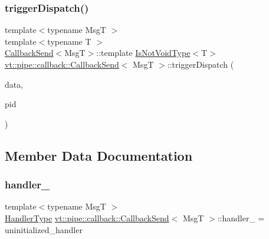 \mbox{\label{structvt_1_1pipe_1_1callback_1_1_callback_send_a5b9348d4e16bfc8718638bf2a2d06e20}} 
\subsubsection{\texorpdfstring{trigger\+Dispatch()}{triggerDispatch()}\hspace{0.1cm}{\footnotesize\ttfamily [4/4]}}
{\footnotesize\ttfamily template$<$typename MsgT $>$ \\
template$<$typename T $>$ \\
\hyperlink{structvt_1_1pipe_1_1callback_1_1_callback_send}{Callback\+Send}$<$MsgT$>$\+::template \hyperlink{structvt_1_1pipe_1_1callback_1_1_callback_send_adb85e64e67e00aa71a9c173565dfb7dc}{Is\+Not\+Void\+Type}$<$T$>$ \hyperlink{structvt_1_1pipe_1_1callback_1_1_callback_send}{vt\+::pipe\+::callback\+::\+Callback\+Send}$<$ MsgT $>$\+::trigger\+Dispatch (\begin{DoxyParamCaption}\item[{\hyperlink{structvt_1_1pipe_1_1callback_1_1_callback_send_a5b21820f25b28f980921b1fe24d8a2dc}{Signal\+Data\+Type} $\ast$}]{data,  }\item[{\mbox{[}\mbox{[}maybe\+\_\+unused\mbox{]} \mbox{]} \hyperlink{namespacevt_ac9852acda74d1896f48f406cd72c7bd3}{Pipe\+Type} const \&}]{pid }\end{DoxyParamCaption})}



\subsection{Member Data Documentation}
\mbox{\label{structvt_1_1pipe_1_1callback_1_1_callback_send_adc779eec6db67dce8bedd1b4bb13319a}} 
\subsubsection{\texorpdfstring{handler\+\_\+}{handler\_}}
{\footnotesize\ttfamily template$<$typename MsgT $>$ \\
\hyperlink{namespacevt_af64846b57dfcaf104da3ef6967917573}{Handler\+Type} \hyperlink{structvt_1_1pipe_1_1callback_1_1_callback_send}{vt\+::pipe\+::callback\+::\+Callback\+Send}$<$ MsgT $>$\+::handler\+\_\+ = uninitialized\+\_\+handler\hspace{0.3cm}{\ttfamily [private]}}

